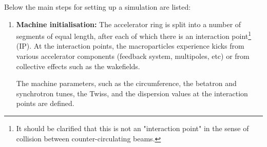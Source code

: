 {Below the main steps for setting up a simulation are listed: %


\begin{enumerate}
    \item \textbf{Machine initialisation:} The accelerator ring is split into a number of segments of equal length, after each of which there is an interaction point\footnote{It should be clarified that this is not an "interaction point" in the sense of collision between counter-circulating beams.} (IP). At the interaction points, the macroparticles experience kicks from various accelerator components (feedback system, multipoles, etc) or from collective effects such as the wakefields. 
    
    The machine parameters, such as the circumference, the betatron and synchrotron tunes, the Twiss, and the dispersion values at the interaction points are defined. %
    

\end{enumerate}}
